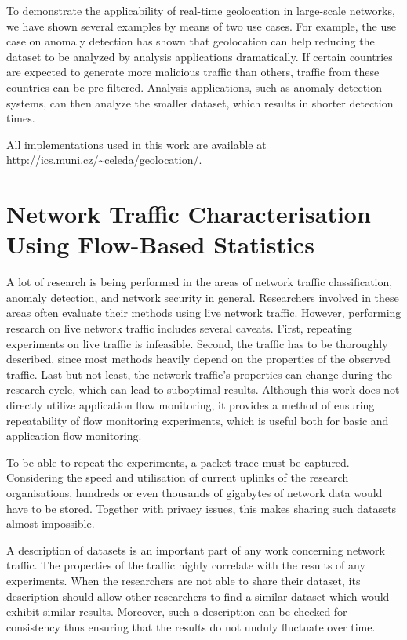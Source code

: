 To demonstrate the applicability of real-time geolocation in large-scale networks, we have shown several examples by means of two use cases. For example, the use case on anomaly detection has shown that geolocation can help reducing the dataset to be analyzed by analysis applications dramatically. If certain countries are expected to generate more malicious traffic than others, traffic from these countries can be pre-filtered. Analysis applications, such as anomaly detection systems, can then analyze the smaller dataset, which results in shorter detection times.

All implementations used in this work are available at \url{http://ics.muni.cz/~celeda/geolocation/}.




\section{Network Traffic Characterisation Using Flow-Based Statistics}\label{sec:analysis-characterisation}

A lot of research is being performed in the areas of network traffic classification, anomaly detection, and network security in general. Researchers involved in these areas often evaluate their methods using live network traffic. However, performing research on live network traffic includes several caveats. First, repeating experiments on live traffic is infeasible. Second, the traffic has to be thoroughly described, since most methods heavily depend on the properties of the observed traffic. Last but not least, the network traffic's properties can change during the research cycle, which can lead to suboptimal results. Although this work does not directly utilize application flow monitoring, it provides a method of ensuring repeatability of flow monitoring experiments, which is useful both for basic and application flow monitoring.

To be able to repeat the experiments, a packet trace must be captured. Considering the speed and utilisation of current uplinks of the research organisations, hundreds or even thousands of gigabytes of network data would have to be stored. Together with privacy issues, this makes sharing such datasets almost impossible. 

A description of datasets is an important part of any work concerning network traffic. The properties of the traffic highly correlate with the results of any experiments. When the researchers are not able to share their dataset, its description should allow other researchers to find a similar dataset which would exhibit similar results. Moreover, such a description can be checked for consistency thus ensuring that the results do not unduly fluctuate over time.

